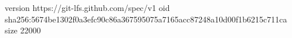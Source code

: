 version https://git-lfs.github.com/spec/v1
oid sha256:5674be1302f0a3efc90c86a367595075a7165acc87248a10d00f1b6215c711ca
size 22000
